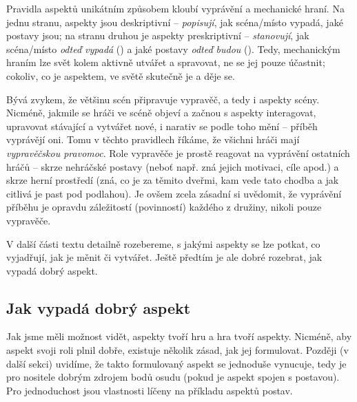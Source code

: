 \documentclass[../main.tex]{subfiles}
\begin{document}
Pravidla aspektů unikátním způsobem kloubí vyprávění a mechanické hraní. Na jednu stranu, aspekty jsou deskriptivní – \emph{popisují}, jak scéna/místo vypadá, jaké postavy jsou; na stranu druhou je aspekty preskriptivní – \emph{stanovují}, jak scéna/místo \emph{odteď vypadá} () a jaké postavy \emph{odteď budou} (). Tedy, mechanickým hraním lze svět kolem aktivně utvářet a spravovat, ne se jej pouze účastnit; cokoliv, co je aspektem, ve světě skutečně je a děje se.

Bývá zvykem, že většinu scén připravuje vypravěč, a tedy i aspekty scény. Nicméně, jakmile se hráči ve scéně objeví a začnou s aspekty interagovat, upravovat stávající a vytvářet nové, i narativ se podle toho mění – příběh vyprávějí oni. Tomu v těchto pravidlech říkáme, že všichni hráči mají \emph{vypravěčskou pravomoc}. Role vypravěče je prostě reagovat na vyprávění ostatních hráčů – skrze nehráčské postavy (neboť např. zná jejich motivaci, cíle apod.) a skrze herní prostředí (zná, co je za těmito dveřmi, kam vede tato chodba a jak citlivá je past pod podlahou). Je ovšem zcela zásadní si uvědomit, že vyprávění příběhu je opravdu záležitostí (povinností) každého z družiny, nikoli pouze vypravěče. 

V další části textu detailně rozebereme, s jakými aspekty se lze potkat, co vyjadřují, jak je měnit či vytvářet. Ještě předtím je ale dobré rozebrat, jak vypadá dobrý aspekt.

\subsection{Jak vypadá dobrý aspekt}
\label{sec:jakvypadadobry}

Jak jsme měli možnost vidět, aspekty tvoří hru a hra tvoří aspekty. Nicméně, aby aspekt svoji roli plnil dobře, existuje několik zásad, jak jej formulovat. Později (v další sekci) uvidíme, že takto formulovaný aspekt se jednoduše vynucuje, tedy je pro nositele dobrým zdrojem bodů osudu (pokud je aspekt spojen s postavou). Pro jednoduchost jsou vlastnosti líčeny na příkladu aspektů postav.
\end{document}
